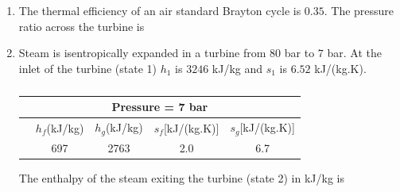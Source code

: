\documentclass[a4paper,10pt]{article}
\begin{document}
\begin{enumerate}
    \item The thermal efficiency of an air standard Brayton cycle is $0.35$. The pressure ratio across the turbine is
    
    \hfill{}
    \begin{enumerate}[label=\Alph*)]
    \end{enumerate}

    \item Steam is isentropically expanded in a turbine from $80$ bar to $7$ bar. At the inlet of the turbine (state 1) $h_1$ is $3246$ kJ/kg and $s_1$ is $6.52$ kJ/(kg.K).
    \begin{table}[h!] \centering \caption*{} \label{tab:q19_thermo}
        \begin{tabular}{|l|c|c|c|c|} \hline
            \multicolumn{5}{|c|}{Pressure = 7 bar} \\ \hline
            & $h_f$(kJ/kg) & $h_g$(kJ/kg) & $s_f$[kJ/(kg.K)] & $s_g$[kJ/(kg.K)] \\ \hline
            & 697 & 2763 & 2.0 & 6.7 \\ \hline
        \end{tabular}
    \end{table}
    The enthalpy of the steam exiting the turbine (state 2) in kJ/kg is
    
    \hfill{}
    \begin{enumerate}[label=\Alph*)]
    \end{enumerate}


\end{enumerate}
\end{document}
